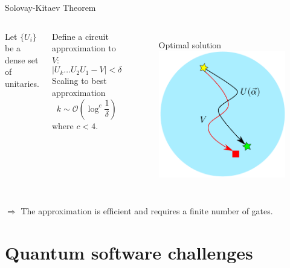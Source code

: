 \documentclass[aspectratio=169, 10pt, xcolor={svgnames}, hyperref={linkcolor=black}]{beamer}
\begin{document}
 \begin{frame}[fragile]{Solovay-Kitaev Theorem}

   \begin{columns}
     \column{6cm}
     Let $\{U_i\}$ be a dense set of unitaries.

     Define a circuit approximation to $V$:
   \begin{equation*}
     |U_k \ldots U_2 U _1 - V| < \delta
   \end{equation*}
   Scaling to best approximation
   \begin{equation*}
     k \sim \mathcal{O}\left(\log^c \frac{1}{\delta} \right)
   \end{equation*}
   where $c < 4$.
   \column{5cm}
   \begin{figure}
     {\color{red} Optimal solution}
     \includegraphics[scale=0.22]{figures/drawing2.pdf}
   \end{figure}
   \end{columns}

   \vspace{0.5cm}
   $\Rightarrow$ The approximation is {\color{blue}efficient} and requires a {\color{magenta}finite number of gates}.

 \end{frame}

\section{Quantum software challenges}
\end{document}

